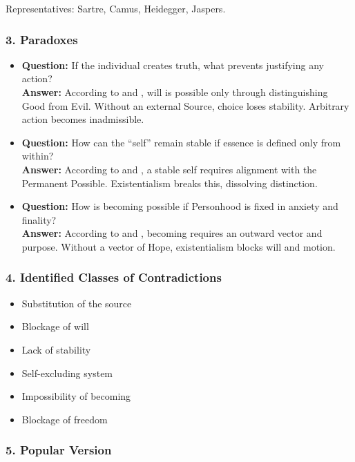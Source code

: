 \documentclass[12pt]{article}
\begin{document}
Representatives: Sartre, Camus, Heidegger, Jaspers.

\subsubsection*{3. Paradoxes}

\begin{itemize}
\item \textbf{Question:} If the individual creates truth, what prevents justifying any action?  
\\ \textbf{Answer:} According to \text{[11.4]} and \text{[6]}, will is possible only through distinguishing Good from Evil. Without an external Source, choice loses stability. Arbitrary action becomes inadmissible.

\item \textbf{Question:} How can the ``self'' remain stable if essence is defined only from within?  
\\ \textbf{Answer:} According to \text{[10.2]} and \text{[3]}, a stable self requires alignment with the Permanent Possible. Existentialism breaks this, dissolving distinction.

\item \textbf{Question:} How is becoming possible if Personhood is fixed in anxiety and finality?  
\\ \textbf{Answer:} According to \text{[7]} and \text{[4.3]}, becoming requires an outward vector and purpose. Without a vector of Hope, existentialism blocks will and motion.
\end{itemize}

\subsubsection*{4. Identified Classes of Contradictions}

\begin{itemize}
\item Substitution of the source
\item Blockage of will
\item Lack of stability
\item Self-excluding system
\item Impossibility of becoming
\item Blockage of freedom
\end{itemize}

\subsubsection*{5. Popular Version}
\end{document}
